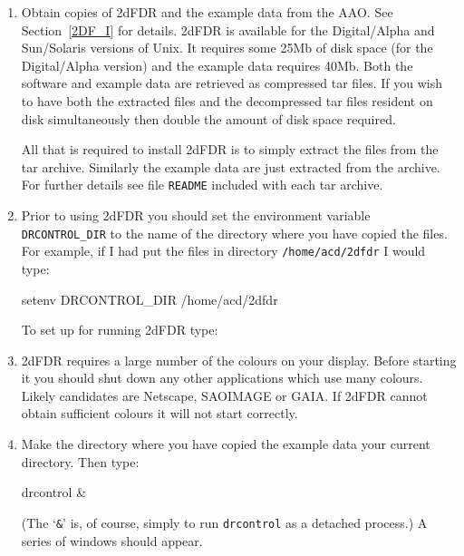\documentclass[twoside,11pt]{starlink}
\begin{document}
\begin{enumerate}

  \item Obtain copies of 2dFDR and the example data from the AAO.
   See Section~\ref{2DF_I} for details.  2dFDR is available for the
   Digital/Alpha and Sun/Solaris versions of Unix.  It requires some 25Mb
   of disk space (for the Digital/Alpha version) and the example data
   requires 40Mb.  Both the software and example data are retrieved as
   compressed tar files.  If you wish to have both the extracted files
   and the decompressed tar files resident on disk simultaneously then
   double the amount of disk space required.

   All that is required to install 2dFDR is to simply extract the
   files from the tar archive.  Similarly the example data are just
   extracted from the archive.  For further details see file \texttt{README} included with each tar archive.

  \item Prior to using 2dFDR you should set the environment variable
   \texttt{DRCONTROL\_DIR} to the name of the directory where you have
   copied the files.  For example, if I had put the files in directory
   \texttt{/home/acd/2dfdr} I would type:

\begin{terminalv}
setenv  DRCONTROL_DIR  /home/acd/2dfdr
\end{terminalv}

   To set up for running 2dFDR type:


  \item 2dFDR requires a large number of the colours on your display.
   Before starting it you should shut down any other applications which
   use many colours.  Likely candidates are Netscape, SAOIMAGE or
   GAIA.  If 2dFDR cannot obtain sufficient colours it will not start
   correctly.

  \item Make the directory where you have copied the example data
   your current directory.  Then type:

\begin{terminalv}
drcontrol &
\end{terminalv}

   (The `\texttt{\&}' is, of course, simply to run \texttt{drcontrol} as a
   detached process.)  A series of windows should appear.


\end{enumerate}
\end{document}
